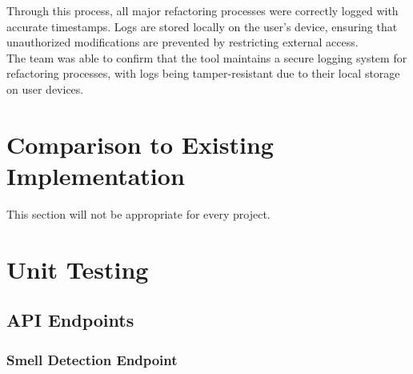 \documentclass[12pt, titlepage]{article}
\begin{document}
\noindent Through this process, all major refactoring processes were correctly logged with accurate timestamps. Logs are stored locally on the user's device, ensuring that unauthorized modifications are prevented by restricting external access.\\

\noindent The team was able to confirm that the tool maintains a secure logging system for refactoring processes, with logs being tamper-resistant due to their local storage on user devices. 

\section{Comparison to Existing Implementation}	

This section will not be appropriate for every project.

\section{Unit Testing}
\newcommand{\testcount}{\stepcounter{testcase}\thetestcase}
\renewcommand{\arraystretch}{1.2} %

\subsection{API Endpoints}

\subsubsection{Smell Detection Endpoint}
\end{document}
